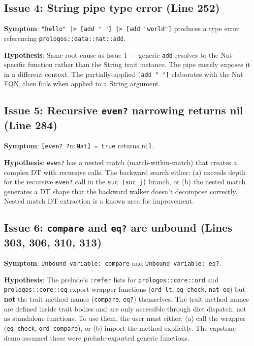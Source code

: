\documentclass[11pt]{article}
\begin{document}
\subsection{Issue 4: String pipe type error (Line 252)}
\label{sec:orge527f78}

\textbf{Symptom}: \texttt{"hello" |> [add " "] |> [add "world"]} produces a type error referencing
\texttt{prologos::data::nat::add}.

\textbf{Hypothesis}: Same root cause as Issue 1 — generic \texttt{add} resolves to the Nat-specific
function rather than the String trait instance. The pipe merely exposes it in a
different context. The partially-applied \texttt{[add " "]} elaborates with the Nat FQN,
then fails when applied to a String argument.
\subsection{Issue 5: Recursive \texttt{even?} narrowing returns nil (Line 284)}
\label{sec:org5a8de04}

\textbf{Symptom}: \texttt{[even? ?n:Nat] = true} returns \texttt{nil}.

\textbf{Hypothesis}: \texttt{even?} has a nested match (match-within-match) that creates a complex
DT with recursive calls. The backward search either: (a) exceeds depth for the
recursive \texttt{even?} call in the \texttt{suc (suc j)} branch, or (b) the nested match
generates a DT shape that the backward walker doesn't decompose correctly. Nested
match DT extraction is a known area for improvement.
\subsection{Issue 6: \texttt{compare} and \texttt{eq?} are unbound (Lines 303, 306, 310, 313)}
\label{sec:orgfae316f}

\textbf{Symptom}: \texttt{Unbound variable: compare} and \texttt{Unbound variable: eq?}.

\textbf{Hypothesis}: The prelude's \texttt{:refer} lists for \texttt{prologos::core::ord} and
\texttt{prologos::core::eq} export wrapper functions (\texttt{ord-lt}, \texttt{eq-check}, \texttt{nat-eq}) but
\textbf{not} the trait method names (\texttt{compare}, \texttt{eq?}) themselves. The trait method names
are defined inside trait bodies and are only accessible through dict dispatch, not as
standalone functions. To use them, the user must either: (a) call the wrapper
(\texttt{eq-check}, \texttt{ord-compare}), or (b) import the method explicitly. The capstone demo
assumed these were prelude-exported generic functions.
\end{document}
